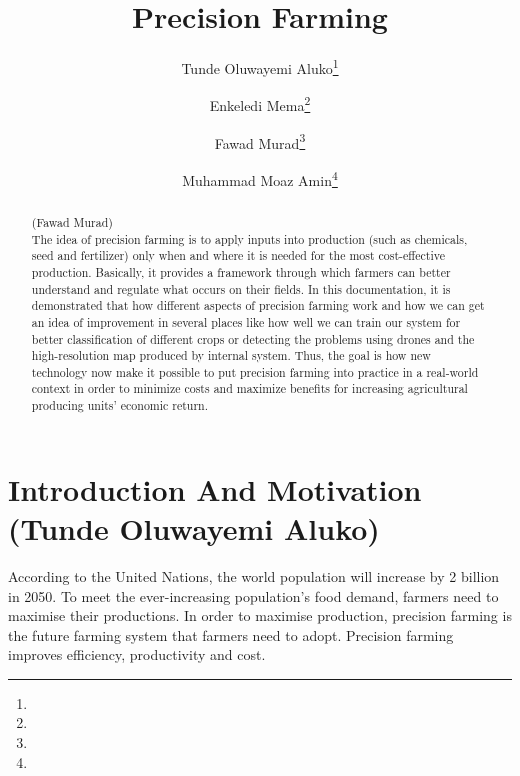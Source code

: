 \documentclass[english]{lni}
\begin{document}
\title[Precision Farming]{Precision Farming}
\author[]{Tunde Oluwayemi Aluko\footnote{ }}

\author[]{Enkeledi Mema\footnote{ }}

\author[]{Fawad Murad\footnote{
}}

\author[]{Muhammad Moaz Amin\footnote{
}}




\maketitle
\tableofcontents
\begin{abstract}
(Fawad Murad) \\

The idea of precision farming is to apply inputs into production (such as chemicals, seed and fertilizer) only when and where it is needed for the most cost-effective production. Basically, it provides a framework through which farmers can better understand and regulate what occurs on their fields. In this documentation, it is demonstrated that how different aspects of precision farming work and how we can get an idea of improvement in several places like how well we can train our system for better classification of different crops or detecting the problems using drones and the high-resolution map produced by internal system. Thus, the goal is how new technology now make it possible to put precision farming into practice in a real-world context in order to minimize costs and maximize benefits for increasing agricultural producing units' economic return.



\end{abstract}

\newpage

\newpage

\section{Introduction And Motivation (Tunde Oluwayemi Aluko)} 

According to the United Nations\cite{united2019department}, the world population will increase by 2 billion in 2050. To meet the ever-increasing population’s food demand, farmers need to maximise their productions. In order to maximise production, precision farming is the future farming system that farmers need to adopt. Precision farming improves efficiency, productivity and cost.
\end{document}
